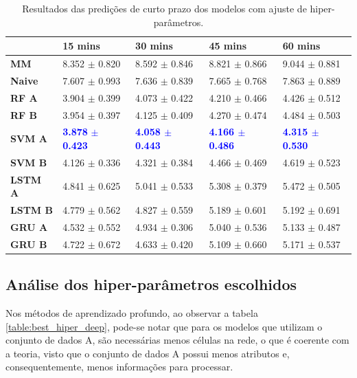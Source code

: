 \begin{table}[H]
    \begin{tabular*}{\linewidth}{@{\extracolsep{\fill}}lllll}
    \toprule
     & 
    \multicolumn{1}{l}{\textbf{15 mins}} & 
    \multicolumn{1}{l}{\textbf{30 mins}} &
    \multicolumn{1}{l}{\textbf{45 mins}} &
    \multicolumn{1}{l}{\textbf{60 mins}} \\
\midrule
\textbf{MM} & 8.352 $\pm$ 0.820 & 8.592 $\pm$ 0.846 & 8.821 $\pm$ 0.866 & 9.044 $\pm$ 0.881
\\
\midrule
\textbf{Naive} & 7.607 $\pm$ 0.993 & 7.636 $\pm$ 0.839 & 7.665 $\pm$ 0.768 & 7.863 $\pm$ 0.889
\\
\midrule
\textbf{RF A} & 3.904 $\pm$ 0.399 & 4.073 $\pm$ 0.422 & 4.210 $\pm$ 0.466 & 4.426 $\pm$ 0.512
\\
\midrule
\textbf{RF B} & 3.954 $\pm$ 0.397 & 4.125 $\pm$ 0.409 & 4.270 $\pm$ 0.474 & 4.484 $\pm$ 0.503
\\
\midrule
\textbf{SVM A} &  \textcolor{blue}{\textbf{3.878} $\pm$}  \textcolor{blue}{\textbf{0.423}} & \textcolor{blue}{\textbf{4.058 $\pm$ 0.443}} & \textcolor{blue}{\textbf{4.166 $\pm$ 0.486}} & \textcolor{blue}{\textbf{4.315 $\pm$ 0.530}}
\\
\midrule
\textbf{SVM B} & 4.126 $\pm$ 0.336 & 4.321 $\pm$ 0.384 & 4.466 $\pm$ 0.469 & 4.619 $\pm$ 0.523
\\
\midrule
\textbf{LSTM A} & 4.841 $\pm$ 0.625 & 5.041 $\pm$ 0.533 & 5.308 $\pm$ 0.379 & 5.472 $\pm$ 0.505
\\
\midrule
\textbf{LSTM B} & 4.779 $\pm$ 0.562 & 4.827 $\pm$ 0.559 & 5.189 $\pm$ 0.601 & 5.192 $\pm$ 0.691
\\
\midrule
\textbf{GRU A} & 4.532 $\pm$ 0.552 & 4.934 $\pm$ 0.306 & 5.040 $\pm$ 0.536 & 5.133 $\pm$ 0.487
\\
\midrule
\textbf{GRU B} & 4.722 $\pm$ 0.672 & 4.633 $\pm$ 0.420 & 5.109 $\pm$ 0.660 & 5.171 $\pm$ 0.537
\\
    \bottomrule
    \end{tabular*}
    \label{table:curto_prazo_tuning}
    \caption{Resultados das predições de curto prazo dos modelos com ajuste de hiper-parâmetros.}
\end{table}

\subsection{Análise dos hiper-parâmetros escolhidos}

Nos métodos de aprendizado profundo, ao observar a tabela \ref{table:best_hiper_deep}, pode-se notar que para os modelos que utilizam o conjunto de dados A, são necessárias menos células na rede, o que é coerente com a teoria, visto que o conjunto de dados A possui menos atributos e, consequentemente, menos informações para processar.

